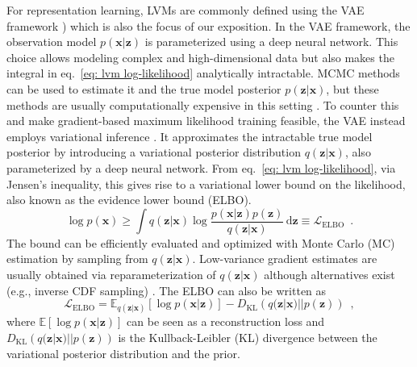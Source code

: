 For representation learning, LVMs are commonly defined using the VAE framework \cite{kingma_auto-encoding_2014, rezende_stochastic_2014}) which is also the focus of our exposition. 
In the VAE framework, the observation model $p(\mathbf{x}|\mathbf{z})$ is parameterized using a deep neural network. This choice allows modeling complex and high-dimensional data but also makes the integral in eq.~\ref{eq: lvm log-likelihood} analytically intractable. MCMC methods can be used to estimate it and the true model posterior $p(\mathbf{z}|\mathbf{x})$, but these methods are usually computationally expensive in this setting \cite{mohamed_monte_2019}. 
To counter this and make gradient-based maximum likelihood training feasible, the VAE instead employs variational inference \cite{jordan_introduction_1999}. It approximates the intractable true model posterior by introducing a variational posterior distribution $q(\mathbf{z}|\mathbf{x})$, also parameterized by a deep neural network. From eq.~\ref{eq: lvm log-likelihood}, via Jensen's inequality, this gives rise to a variational lower bound on the likelihood, also known as the evidence lower bound (ELBO).
\begin{equation}
    \log p(\mathbf{x}) \geq \int q(\mathbf{z}|\mathbf{x}) \log \frac{p(\mathbf{x}| \mathbf{z})p(\mathbf{z})}{q(\mathbf{z}|\mathbf{x})} \,\text{d}\mathbf{z} \equiv \mathcal{L}_{\text{ELBO}} \enspace . \label{eq: lvm likelihood bound (elbo)}
\end{equation}
The bound can be efficiently evaluated and optimized with Monte Carlo (MC) estimation by sampling from $q(\mathbf{z}|\mathbf{x})$. Low-variance gradient estimates are usually obtained via reparameterization of $q(\mathbf{z}|\mathbf{x})$ \cite{kingma_auto-encoding_2014} although alternatives exist (e.g., inverse CDF sampling) \cite{mohamed_monte_2019}. 
The ELBO can also be written as
\begin{equation}
    \mathcal{L}_{\text{ELBO}} = \mathbb{E}_{q(\mathbf{z}|\mathbf{x})}\left[ \log p(\mathbf{x}|\mathbf{z}) \right] - D_\text{KL}\left( q(\mathbf{z}|\mathbf{x}) || p(\mathbf{z}) \right) \enspace  \label{eq: lvm likelihood bound recon/kl form (elbo)},
\end{equation}
where $\mathbb{E}\left[ \log p(\mathbf{x}|\mathbf{z}) \right]$ can be seen as a reconstruction loss and $D_\text{KL}\left( q(\mathbf{z}|\mathbf{x})||p(\mathbf{z}) \right)$ is the Kullback-Leibler (KL) divergence between the variational posterior distribution and the prior.

